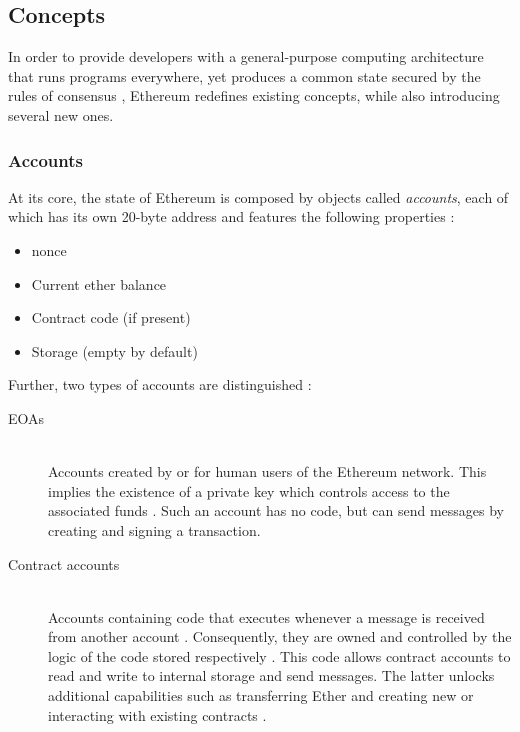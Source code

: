

\subsection{Concepts}
In order to provide developers with a general-purpose computing architecture that runs programs everywhere, yet produces a common state secured by the rules of consensus \cite[p.~31]{Antonopoulos.2018}, Ethereum redefines existing concepts, while also introducing several new ones.

\subsubsection{Accounts}
At its core, the state of Ethereum is composed by objects called \textit{accounts}, each of which has its own 20-byte address and features the following properties \cite[p.~17]{ethereumWhitepaperGitHub}: 

\begin{itemize}
  \item \Gls{nonce}
  \item Current ether balance
  \item Contract code (if present)
  \item Storage (empty by default)
\end{itemize}

Further, two types of accounts are distinguished \cite[p.~17]{ethereumWhitepaperGitHub}:

\begin{description}
	\item[\acp{EOA}]
	\hfill \\
	Accounts created by or for human users of the Ethereum network. This implies the existence of a private key which controls access to the associated funds \cite[p.~13]{Antonopoulos.2018}. Such an account has no code, but can send messages by creating and signing a transaction.
	\item[Contract accounts]
	\hfill \\
	Accounts containing code that executes whenever a message is received from another account \cite[p.~13]{Antonopoulos.2018}. Consequently, they are owned and controlled by the logic of the code stored respectively \cite[p.~57]{Antonopoulos.2018}. This code allows contract accounts to read and write to internal storage and send messages. The latter unlocks additional capabilities such as transferring Ether and creating new or interacting with existing contracts \cite[p.~19]{ethereumWhitepaperGitHub}.
\end{description}

